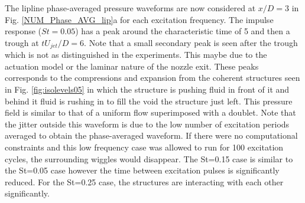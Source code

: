 \documentclass[english]{aiaa-tc}
\begin{document}
The lipline phase-averaged pressure waveforms are now considered at $x/D=3$ in Fig. \ref{NUM_Phase_AVG_lip}a for each excitation frequency. The impulse response ($St=0.05$) has a peak around the characteristic time of 5 and then a trough at $tU_{jet}/D=6$. Note that a small secondary peak is seen after the trough which is not as distinguished in the experiments. This maybe due to the actuation model or the laminar nature of the nozzle exit.
These peaks corresponds to the compressions and expansion from the coherent structures seen in Fig. \ref{fig:isolevels05} in which the structure is pushing fluid in front of it and behind it fluid is rushing in to fill the void the structure just left. This pressure field is similar to that of a uniform flow superimposed with a doublet. Note that the jitter outside this waveform is due to the low number of excitation periods averaged to obtain the phase-averaged waveform. If there were no computational constraints and this low frequency case was allowed to run for 100 excitation cycles, the surrounding wiggles would disappear. The St=0.15 case is similar to  the St=0.05 case however the time between excitation pulses is significantly reduced. For the St=0.25 case, the structures are interacting with each other significantly.
\end{document}
